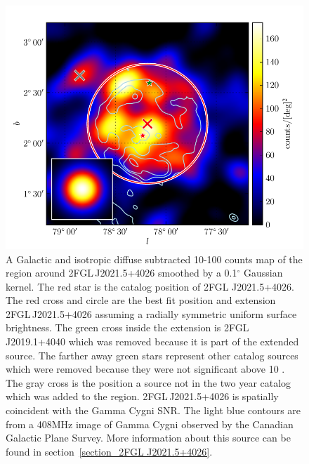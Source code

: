 \documentclass[12pt,preprint]{aastex}
\newcommand{\gev}{\text{GeV}\xspace}
\renewcommand{\deg}{\ensuremath{^\circ}\xspace}
\begin{document}
\begin{figure}
  \begin{center}
    \includegraphics[type=pdf,ext=.pdf,read=.pdf]{source_plots/source_Gamma_Cygni}
  \end{center}
  \caption{A Galactic and isotropic diffuse subtracted 10-100
  \gev counts map of the region around 2FGL\,J2021.5+4026 smoothed by a
  0.1\deg Gaussian kernel. The red star is the catalog position of 2FGL
  J2021.5+4026.  The red cross and circle are the best fit position and
  extension 2FGL\,J2021.5+4026 
  assuming a radially
  symmetric uniform surface brightness. 
  The green cross inside the extension is 2FGL\,J2019.1+4040 which
  was removed because it is part of the extended source.  The farther
  away green stars represent other catalog sources which were removed
  because they were not significant above 10 \gev.  The gray cross is
  the position a source not in the two year catalog which was added
  to the region. 2FGL\,J2021.5+4026 is spatially coincident with the
  Gamma Cygni SNR.  The light blue contours are from a 408MHz image of Gamma Cygni
  observed by the Canadian Galactic Plane Survey.  More information about
  this source can be found in section~\ref{section_2FGL J2021.5+4026}.
  }\label{1FGL_J2020.0+4049}
\end{figure}
\end{document}
